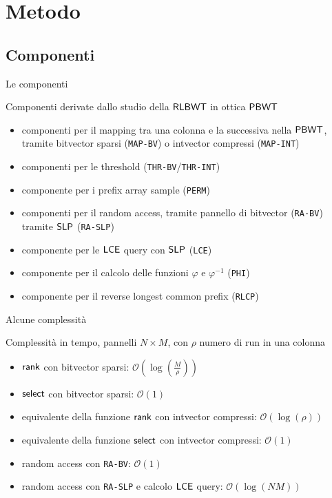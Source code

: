 \documentclass[]{beamer}
\def\SLP{\mbox{\rm {\sf SLP}}}
\def\rank{\mbox{\rm {\sf rank}}}
\def\LCE{\mbox{\rm {\sf LCE}}}
\def\select{\mbox{\rm {\sf select}}}
\def\RLBWT{\mbox{\rm {\sf RLBWT}}}
\def\PBWT{\mbox{\rm {\sf PBWT}}}
\def\LCE{\mbox{\rm {\sf LCE}}}
\begin{document}
\section{Metodo}
\subsection{Componenti}
\begin{frame}{Le componenti}
  \begin{block}{Componenti derivate dallo studio della $\RLBWT$ in ottica
      $\PBWT$} 
    \begin{itemize}
      \item componenti per il mapping tra una colonna e la successiva nella
      $\PBWT$, tramite bitvector sparsi (\texttt{MAP-BV}) o intvector compressi
      (\texttt{MAP-INT})
      \item componenti per le threshold (\texttt{THR-BV}/\texttt{THR-INT})
      \item componente per i prefix array sample (\texttt{PERM})
      \item componenti per il random access, tramite pannello di bitvector
      (\texttt{RA-BV}) tramite $\SLP$ (\texttt{RA-SLP})
      \item componente per le $\LCE$ query con $\SLP$ (\texttt{LCE})
      \item componente per il calcolo delle funzioni $\varphi$ e $\varphi^{-1}$
      (\texttt{PHI})
      \item componente per il reverse longest common prefix (\texttt{RLCP})
    \end{itemize}
  \end{block}
\end{frame}
\begin{frame}{Alcune complessità}
  \begin{block}{Complessità in tempo, pannelli $N\times M$, con $\rho$ numero di
    run in una colonna}
    \begin{itemize}
      \item $\rank$ con bitvector sparsi:
      $\mathcal{O}\left(\log\left(\frac{M}{\rho}\right)\right)$
      \item $\select$ con bitvector sparsi: $\mathcal{O}\left(1\right)$
      \item equivalente della funzione $\rank$ con intvector compressi:
      $\mathcal{O}\left(\log\left(\rho\right)\right)$
      \item equivalente della funzione $\select$ con intvector compressi:
      $\mathcal{O}\left(1\right)$ 
      \item random access con \texttt{RA-BV}: $\mathcal{O}(1)$
      \item random access con \texttt{RA-SLP} e calcolo $\LCE$ query:
      $\mathcal{O} (\log(NM))$
    \end{itemize}
  \end{block}
\end{frame}
\end{document}
